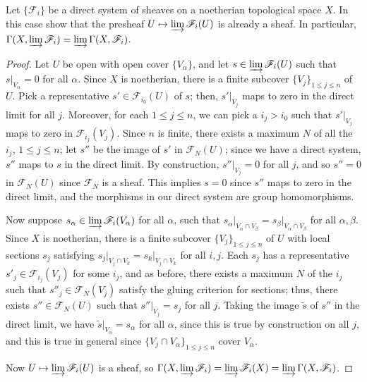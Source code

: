 \documentclass[10pt]{article}
\theoremstyle{definition}
\theoremstyle{remark}
\numberwithin{equation}{section}
\numberwithin{figure}{subsubsection}
\begin{document}
\begin{problem}
  Let $\{\mathscr{F}_i\}$ be a direct system of sheaves on a noetherian topological space $X$. In this case show that the presheaf $U \mapsto \varinjlim \mathscr{F}_i(U)$ is already a sheaf. In particular, $\Gamma(X,\varinjlim \mathscr{F}_i) = \varinjlim\Gamma(X,\mathscr{F}_i)$.
\end{problem}
\begin{proof}
  Let $U$ be open with open cover $\{V_\alpha\}$, and let $s \in \varinjlim\mathscr{F}_i(U)$ such that $s\vert_{V_\alpha} = 0$ for all $\alpha$. Since $X$ is noetherian, there is a finite subcover $\{V_j\}_{1\le j \le n}$ of $U$. Pick a representative $s' \in \mathscr{F}_{i_0}(U)$ of $s$; then, $s'\vert_{V_j}$ maps to zero in the direct limit for all $j$. Moreover, for each $1 \le j \le n$, we can pick a $i_j > i_0$ such that $s'\vert_{V_j}$ maps to zero in $\mathscr{F}_{i_j}(V_j)$. Since $n$ is finite, there exists a maximum $N$ of all the $i_j$, $1 \le j \le n$; let $s''$ be the image of $s'$ in $\mathscr{F}_N(U)$; since we have a direct system, $s''$ maps to $s$ in the direct limit. By construction, $s''\vert_{V_j} = 0$ for all $j$, and so $s'' = 0$ in $\mathscr{F}_N(U)$ since $\mathscr{F}_N$ is a sheaf. This implies $s = 0$ since $s''$ maps to zero in the direct limit, and the morphisms in our direct system are group homomorphisms.
  \par Now suppose $s_\alpha \in \varinjlim\mathscr{F}_i(V_\alpha)$ for all $\alpha$, such that $s_\alpha\vert_{V_\alpha \cap V_\beta} = s_\beta\vert_{V_\alpha \cap V_\beta}$ for all $\alpha,\beta$. Since $X$ is noetherian, there is a finite subcover $\{V_j\}_{1\le j \le n}$ of $U$ with local sections $s_j$ satisfying $s_j\vert_{V_j \cap V_k} = s_k\vert_{V_j\cap V_k}$ for all $i,j$. Each $s_j$ has a representative $s'_j \in \mathscr{F}_{i_j}(V_j)$ for some $i_j$, and as before, there exists a maximum $N$ of the $i_j$ such that $s''_j \in \mathscr{F}_N(V_j)$ satisfy the gluing criterion for sections; thus, there exists $s'' \in \mathscr{F}_N(U)$ such that $s'' \vert_{V_j} = s_j$ for all $j$. Taking the image $\tilde{s}$ of $s''$ in the direct limit, we have $\tilde{s}\vert_{V_\alpha} = s_\alpha$ for all $\alpha$, since this is true by construction on all $j$, and this is true in general since $\{V_j \cap V_\alpha\}_{1\le j \le n}$ cover $V_\alpha$.
  \par Now $U \mapsto \varinjlim \mathscr{F}_i(U)$ is a sheaf, so $\Gamma(X,\varinjlim \mathscr{F}_i) = \varinjlim\mathscr{F}_i(X) = \varinjlim\Gamma(X,\mathscr{F}_i)$.
\end{proof}
\end{document}
